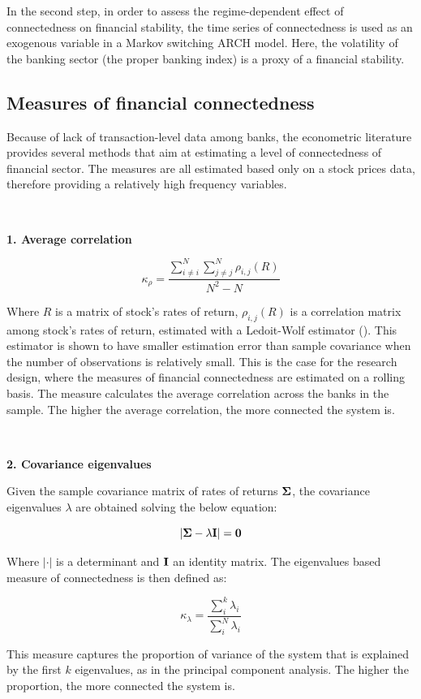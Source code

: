 \documentclass{article}
\begin{document}
In the second step, in order to assess the regime-dependent effect of connectedness on financial stability, the time series of connectedness is used as an exogenous variable in a Markov switching ARCH model. Here, the volatility of the banking sector (the proper banking index) is a proxy of a financial stability.

\subsection*{Measures of financial connectedness}

Because of lack of transaction-level data among banks, the econometric literature provides several methods that aim at estimating a level of connectedness of financial sector. The measures are all estimated based only on a stock prices data, therefore providing a relatively high frequency variables. 

\

\textbf{1. Average correlation} 

\[\kappa_{\rho} = \frac{\sum_{i \neq i}^{N} \sum_{j \neq j}^{N} \rho_{i,j}(R)}{N^2-N}\]

Where $R$ is a matrix of stock's rates of return, $\rho_{i,j}(R)$ is a correlation matrix among stock's rates of return, estimated with a Ledoit-Wolf estimator (\citet{ledoit}). This estimator is shown to have smaller estimation error than sample covariance when the number of observations is relatively small. This is the case for the research design, where the measures of financial connectedness are estimated on a rolling basis. The measure calculates the average correlation across the banks in the sample. The higher the average correlation, the more connected the system is.

\

\textbf{2. Covariance eigenvalues}

Given the sample covariance matrix of  rates of returns $\bf{\Sigma}$, the covariance eigenvalues $\lambda$ are obtained solving the below equation:

\[|\bf{\Sigma} - \lambda \bf{I}| = 0\]

Where $|\cdot|$ is a determinant and $\bf{I}$ an identity matrix. The eigenvalues based measure of connectedness is then defined as:

\[\kappa_{\lambda} = \frac{\sum_{i}^{k} \lambda_i}{\sum_{i}^{N} \lambda_i}\]

This measure captures the proportion of variance of the system that is explained by the first $k$ eigenvalues, as in the principal component analysis. The higher the proportion, the more connected the system is.
\end{document}
